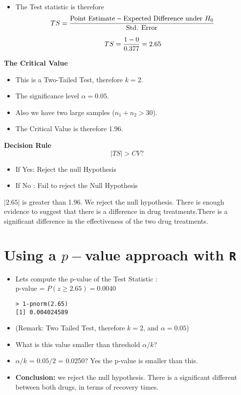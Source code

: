 \documentclass[a4paper,12pt]{article}
\begin{document}
\begin{itemize}
\item The Test statistic is therefore
\[ TS = {\mbox{Point Estimate} - \mbox{Expected Difference under } H_0 \over \mbox{Std. Error}} \]

\[TS = {1 - 0 \over 0.377 } = 2.65 \]


\end{itemize}


\noindent \textbf{The Critical Value}
\begin{itemize}

\item This is a Two-Tailed Test, therefore $k = 2$.
\item The significance level $\alpha = 0.05$. 
\item Also we have two large samples ($n_1 + n_2 > 30$). 
\item The Critical Value is therefore 1.96.
\end{itemize}

\noindent \textbf{Decision Rule}
\[ |TS| > CV ?  \]
\begin{itemize}
\item If Yes: Reject the null Hypothesis
\item If No : Fail to reject the Null Hypothesis
\end{itemize}
$|2.65|$ is greater than 1.96. We reject the null hypothesis.  There is enough evidence to suggest that there is a difference in drug treatments.There is a significant difference in the effectiveness of the two drug treatments.


\section*{Using a $p-$value approach with \texttt{R}}
\begin{itemize}
\item Lets compute the p-value of the Test Statistic : \\
p-value = $P(z \geq 2.65) = 0.0040$
\begin{verbatim}
> 1-pnorm(2.65)
[1] 0.004024589
\end{verbatim}
\item (Remark: Two Tailed Test, therefore $k = 2$, and $\alpha = 0.05$)
\item What is this value smaller than threshold $\alpha / k$? \\
\item $\alpha / k$ = $0.05/2$ = 0.0250? Yes the p-value is smaller than this.
\item \textbf{Conclusion:} we reject the null hypothesis. There is a significant different between both drugs, in terms of recovery times.

\end{itemize}
\end{document}
